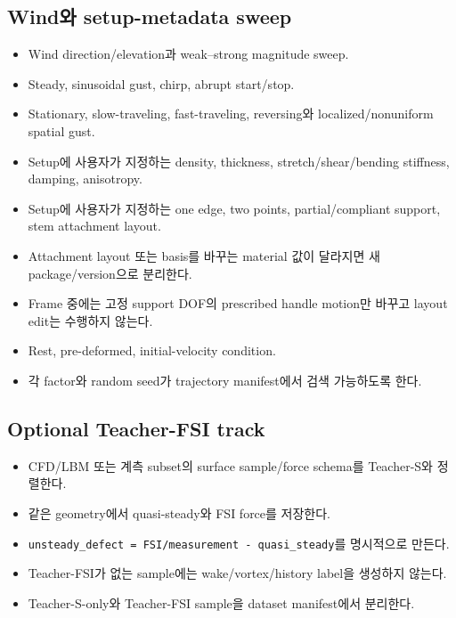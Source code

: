 \documentclass[10pt,a4paper]{article}
\newcommand{\todo}{\textcolor{TodoGray}{\(\square\)}}
\newcommand{\code}[1]{\texttt{#1}}
\begin{document}
\subsection*{Wind와 setup-metadata sweep}

\begin{itemize}
  \item[\todo] Wind direction/elevation과 weak--strong magnitude sweep.
  \item[\todo] Steady, sinusoidal gust, chirp, abrupt start/stop.
  \item[\todo] Stationary, slow-traveling, fast-traveling, reversing와 localized/nonuniform spatial gust.
  \item[\todo] Setup에 사용자가 지정하는 density, thickness, stretch/shear/bending stiffness, damping, anisotropy.
  \item[\todo] Setup에 사용자가 지정하는 one edge, two points, partial/compliant support, stem attachment layout.
  \item[\todo] Attachment layout 또는 basis를 바꾸는 material 값이 달라지면 새 package/version으로 분리한다.
  \item[\todo] Frame 중에는 고정 support DOF의 prescribed handle motion만 바꾸고 layout edit는 수행하지 않는다.
  \item[\todo] Rest, pre-deformed, initial-velocity condition.
  \item[\todo] 각 factor와 random seed가 trajectory manifest에서 검색 가능하도록 한다.
\end{itemize}

\subsection*{Optional Teacher-FSI track}

\begin{itemize}
  \item[\todo] CFD/LBM 또는 계측 subset의 surface sample/force schema를 Teacher-S와 정렬한다.
  \item[\todo] 같은 geometry에서 quasi-steady와 FSI force를 저장한다.
  \item[\todo] \code{unsteady\_defect = FSI/measurement - quasi\_steady}를 명시적으로 만든다.
  \item[\todo] Teacher-FSI가 없는 sample에는 wake/vortex/history label을 생성하지 않는다.
  \item[\todo] Teacher-S-only와 Teacher-FSI sample을 dataset manifest에서 분리한다.
\end{itemize}
\end{document}
